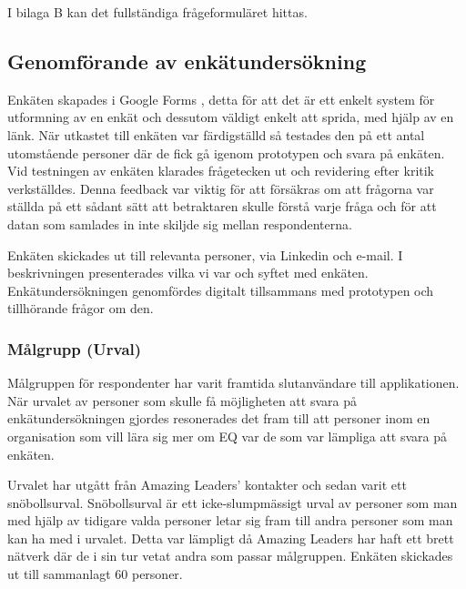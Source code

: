 I bilaga B kan det fullständiga frågeformuläret hittas. 

\subsection{Genomförande av enkätundersökning}
Enkäten skapades i Google Forms \cite{GoogleForms}, detta för att det är ett enkelt system för utformning av en enkät och dessutom väldigt enkelt att sprida, med hjälp av en länk. När utkastet till enkäten var färdigställd så testades den på ett antal utomstående personer där de fick gå igenom prototypen och svara på enkäten. Vid testningen av enkäten klarades frågetecken ut och revidering efter kritik verkställdes. Denna feedback var viktig för att försäkras om att frågorna var ställda på ett sådant sätt att betraktaren skulle förstå varje fråga och för att datan som samlades in inte skiljde sig mellan respondenterna. 
\newline

Enkäten skickades ut till relevanta personer, via Linkedin och e-mail. I beskrivningen presenterades vilka vi var och syftet med enkäten. Enkätundersökningen genomfördes digitalt tillsammans med prototypen och tillhörande frågor om den. 
\newline

\subsubsection{Målgrupp (Urval)}
Målgruppen för respondenter har varit framtida slutanvändare till applikationen. När urvalet av personer som skulle få möjligheten att svara på enkätundersökningen gjordes resonerades det fram till att personer inom en organisation som vill lära sig mer om EQ var de som var lämpliga att svara på enkäten. 
\newline

Urvalet har utgått från Amazing Leaders' kontakter och sedan varit ett snöbollsurval\cite{RankinKvalitativaMetoder}. Snöbollsurval är ett icke-slumpmässigt urval av personer som man med hjälp av tidigare valda personer letar sig fram till andra personer som man kan ha med i urvalet. \cite{VejdeSnobollsurval} Detta var lämpligt då Amazing Leaders har haft ett brett nätverk där de i sin tur vetat andra som passar målgruppen. Enkäten skickades ut till sammanlagt 60 personer.
\label{sec:perspektiv}


